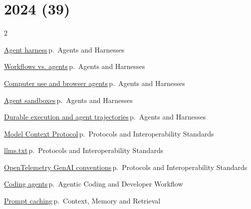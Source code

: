\documentclass[10pt,a4paper,openany]{report}
\begin{document}
\section{2024 (39)}
\begin{multicols}{2}\small\raggedright
\hyperref[c:agents-0]{Agent harness}\,{\color{muted}\scriptsize p.\,\pageref{c:agents-0}} {\color{muted}\scriptsize Agents and Harnesses}\par\vspace{2pt}
\hyperref[c:agents-4]{Workflows vs. agents}\,{\color{muted}\scriptsize p.\,\pageref{c:agents-4}} {\color{muted}\scriptsize Agents and Harnesses}\par\vspace{2pt}
\hyperref[c:agents-9]{Computer use and browser agents}\,{\color{muted}\scriptsize p.\,\pageref{c:agents-9}} {\color{muted}\scriptsize Agents and Harnesses}\par\vspace{2pt}
\hyperref[c:agents-11]{Agent sandboxes}\,{\color{muted}\scriptsize p.\,\pageref{c:agents-11}} {\color{muted}\scriptsize Agents and Harnesses}\par\vspace{2pt}
\hyperref[c:agents-13]{Durable execution and agent trajectories}\,{\color{muted}\scriptsize p.\,\pageref{c:agents-13}} {\color{muted}\scriptsize Agents and Harnesses}\par\vspace{2pt}
\hyperref[c:protocols-0]{Model Context Protocol}\,{\color{muted}\scriptsize p.\,\pageref{c:protocols-0}} {\color{muted}\scriptsize Protocols and Interoperability Standards}\par\vspace{2pt}
\hyperref[c:protocols-10]{llms.txt}\,{\color{muted}\scriptsize p.\,\pageref{c:protocols-10}} {\color{muted}\scriptsize Protocols and Interoperability Standards}\par\vspace{2pt}
\hyperref[c:protocols-11]{OpenTelemetry GenAI conventions}\,{\color{muted}\scriptsize p.\,\pageref{c:protocols-11}} {\color{muted}\scriptsize Protocols and Interoperability Standards}\par\vspace{2pt}
\hyperref[c:coding-0]{Coding agents}\,{\color{muted}\scriptsize p.\,\pageref{c:coding-0}} {\color{muted}\scriptsize Agentic Coding and Developer Workflow}\par\vspace{2pt}
\hyperref[c:context-3]{Prompt caching}\,{\color{muted}\scriptsize p.\,\pageref{c:context-3}} {\color{muted}\scriptsize Context, Memory and Retrieval}\par\vspace{2pt}

\end{multicols}
\end{document}
